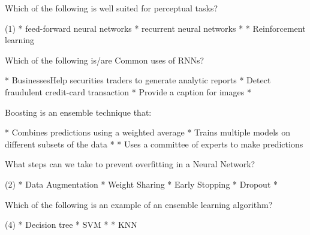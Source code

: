 \documentclass[10pt]{extarticle}
\begin{document}
\begin{exercise}
    Which of the following is well suited for perceptual tasks?
    \begin{choice} (1)
        * feed-forward neural networks
        * recurrent neural networks
        * 
        * Reinforcement learning
    \end{choice}
\end{exercise}
\begin{solution}
\end{solution}

\begin{exercise}
    Which of the following is/are Common uses of RNNs?
    \begin{choice}
        * BusinessesHelp securities traders to generate analytic reports
        * Detect fraudulent credit-card transaction
        * Provide a caption for images
        * 
    \end{choice}
\end{exercise}
\begin{solution}
\end{solution}

\begin{exercise}
    Boosting is an ensemble technique that:
    \begin{choice}
        * Combines predictions using a weighted average
        * Trains multiple models on different subsets of the data
        * 
        * Uses a committee of experts to make predictions
    \end{choice}
\end{exercise}
\begin{solution}
\end{solution}

\begin{exercise}
    What steps can we take to prevent overfitting in a Neural Network?
    \begin{choice}(2)
        * Data Augmentation
        * Weight Sharing
        * Early Stopping
        * Dropout
        * 
    \end{choice}
\end{exercise}
\begin{solution}
\end{solution}

\begin{exercise}
    Which of the following is an example of an ensemble learning algorithm?
    \begin{choice} (4)
        * Decision tree
        * SVM
        * 
        * KNN
    \end{choice}
\end{exercise}
\begin{solution}
\end{solution}
\end{document}
